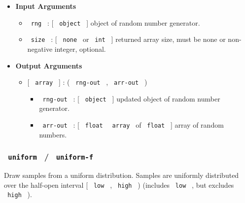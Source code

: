 \begin{Shaded}
\begin{Highlighting}[]
\end{Highlighting}
\end{Shaded}

\begin{itemize}
\item
  \textbf{Input Arguments}

  \begin{itemize}
  \tightlist
  \item
    \texttt{\ rng\ } : {[} \texttt{\ object\ } {]} object of random
    number generator.
  \item
    \texttt{\ size\ } : {[} \texttt{\ none\ } or \texttt{\ int\ } {]}
    returned array size, must be none or non-negative integer, optional.
  \end{itemize}
\item
  \textbf{Output Arguments}

  \begin{itemize}
  \tightlist
  \item
    {[} \texttt{\ array\ } {]} : ( \texttt{\ rng-out\ } ,
    \texttt{\ arr-out\ } )

    \begin{itemize}
    \tightlist
    \item
      \texttt{\ rng-out\ } : {[} \texttt{\ object\ } {]} updated object
      of random number generator.
    \item
      \texttt{\ arr-out\ } : {[} \texttt{\ float\ } \textbar{}
      \texttt{\ array\ } of \texttt{\ float\ } {]} array of random
      numbers.
    \end{itemize}
  \end{itemize}
\end{itemize}

\subsubsection{\texorpdfstring{\texttt{\ uniform\ } /
\texttt{\ uniform-f\ }}{ uniform  /  uniform-f }}\label{uniform-uniform-f}

Draw samples from a uniform distribution. Samples are uniformly
distributed over the half-open interval {[} \texttt{\ low\ } ,
\texttt{\ high\ } ) (includes \texttt{\ low\ } , but excludes
\texttt{\ high\ } ).

\begin{Shaded}
\begin{Highlighting}[]
\end{Highlighting}
\end{Shaded}

